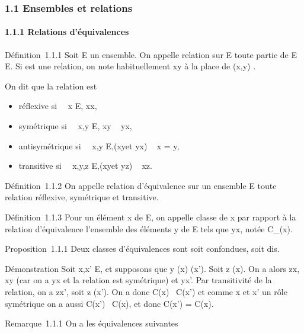 

\subsubsection{1.1 Ensembles et relations}

\paragraph{1.1.1 Relations d'équivalences}

Définition~1.1.1 Soit E un ensemble. On appelle relation sur E toute
partie de E \times E. Si  est une relation, on note habituellement xy à la
place de (x,y) \in{}.

On dit que la relation est

\begin{itemize}
\itemsep1pt\parskip0pt
\item
  réflexive si \forall~~x \in E, xx,
\item
  symétrique si \forall~~x,y \in E,\quad
  xy \rigtharrow~ yx,
\item
  antisymétrique si \forall~~x,y \in
  E,\quad (xy\text et yx) \rigtharrow~ x = y,
\item
  transitive si \forall~~x,y,z \in
  E,\quad (xy\text et yz) \rigtharrow~ xz.
\end{itemize}

Définition~1.1.2 On appelle relation d'équivalence sur un ensemble E
toute relation réflexive, symétrique et transitive.

Définition~1.1.3 Pour un élément x de E, on appelle classe de x par
rapport à la relation d'équivalence  l'ensemble des éléments y de E
tels que yx, notée C\_(x).

Proposition~1.1.1 Deux classes d'équivalences sont soit confondues, soit
dis\jmathointes.

Démonstration Soit x,x' \in E, et supposons que y \inC(x) \bigcapC(x'). Soit z
\inC(x). On a alors zx, xy (car on a yx et la relation est symétrique)
et yx'. Par transitivité de la relation, on a zx', soit z \inC(x'). On a
donc C(x) \subset~C(x') et comme x et x' \jmathouent un rôle symétrique on a aussi
C(x') \subset~C(x), et donc C(x') = C(x).

Remarque~1.1.1 On a les équivalences suivantes

